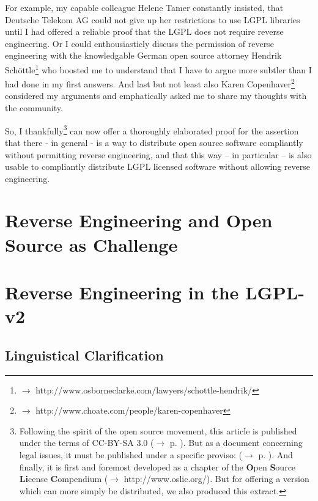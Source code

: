 \documentclass[DIV=calc,BCOR=5mm,12pt,headings=small,oneside,toc=bib]{scrartcl}
\begin{document}
For example, my capable colleague Helene Tamer constantly insisted, that
Deutsche Telekom AG could not give up her restrictions to use LGPL libraries
until I had offered a reliable proof that the LGPL does not require reverse
engineering. Or I could enthousiasticly discuss the permission of reverse
engineering with the knowledgable German open source attorney Hendrik
Schöttle\footnote{$\rightarrow$
http://www.osborneclarke.com/lawyers/schottle-hendrik/} who boosted me to
understand that I have to argue more subtler than I had done in my first
answers. And last but not least also Karen Copenhaver\footnote{$\rightarrow$
http://www.choate.com/people/karen-copenhaver} considered my arguments and
emphatically asked me to share my thoughts with the community.

So, I thankfully\footnote{Following the spirit of the open source movement, this
article is published under the terms of CC-BY-SA 3.0 ($\rightarrow$ p.
\pageref{License}). But as a document concerning legal issues, it must  be
published under a specific proviso: ($\rightarrow$ p. \pageref{Disclaimer}). And
finally, it is first and foremost developed as a chapter of the \textbf{O}pen
\textbf{S}ource \textbf{Li}cense \textbf{C}ompendium ($\rightarrow$
http://www.oslic.org/). But for offering a version which can more simply be
distributed, we also produced this extract.} can now offer a thoroughly
elaborated proof for the assertion that there - in general - is a way to
distribute open source software compliantly without permitting reverse
engineering, and that this way -- in particular -- is also usable to compliantly
distribute LGPL licensed software without allowing reverse engineering.

\footnotesize
\tableofcontents
\normalsize

\section{Reverse Engineering and Open Source as Challenge}

\section{Reverse Engineering in the LGPL-v2}

\subsection{Linguistical Clarification}

\end{document}
